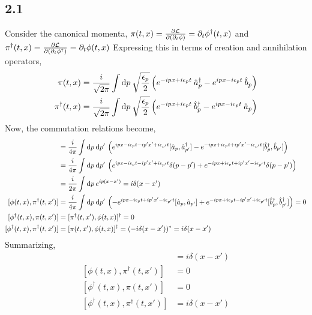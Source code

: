 \documentclass[12pt]{extarticle}
\begin{document}
\subsection*{2.1}
Consider the canonical momenta, $\pi(t, x) = \frac{\partial{\mathcal{L}}}{\partial{(\partial_t \phi)}} = \partial_t \phi^\dagger(t, x)$ and $\pi^\dagger(t, x) = \frac{\partial{\mathcal{L}}}{\partial{(\partial_t \phi^\dagger)}} = \partial_t \phi(t, x)$  Expressing this in terms of creation and annihilation operators,
\begin{align*} 
\pi(t, x) & = \frac{i}{\sqrt{2 \pi}} \int \mathrm{d}p \: \sqrt{\frac{\epsilon_p}{2}} \left(  e^{-i p x + i \epsilon_p t} \: \hat{a}^\dagger_p - e^{i p x - i \epsilon_p t} \: \hat{b}_p\right)
\\
\pi^\dagger(t, x) & = \frac{i}{\sqrt{2 \pi}} \int \mathrm{d}p \: \sqrt{\frac{\epsilon_p}{2}} \left( e^{- i p x + i \epsilon_p t} \: \hat{b}^\dagger_p - e^{i p x - i \epsilon_p t} \: \hat{a}_p \right) 
\end{align*}
Now, the commutation relations become,
\begin{align*}
[\phi(t, x), \pi(t, x')] & = \frac{i}{4\pi} \int \d{p} \d{p'} \left(e^{i p x - i \epsilon_p t - i p' x' + i \epsilon_{p'} t} [\a_p, \adag_{p'}] - e^{-i p x + i \epsilon_p t + i p' x' - i \epsilon_{p'} t} [\bdag_p, \b_{p'}] \right) 
\\
& = \frac{i}{4\pi} \int \d{p} \d{p'} \left(e^{i p x - i \epsilon_p t - i p' x' + i \epsilon_{p'} t} \delta(p - p') + e^{-i p x + i \epsilon_p t + i p' x' - i \epsilon_{p'} t} \delta(p - p') \right) 
\\
& = \frac{i}{2\pi} \int \d{p} e^{i p (x - x')} = i \delta(x  - x') 
\\
[\phi(t, x), \pi^\dagger(t, x')] & = \frac{i}{4\pi} \int \d{p} \d{p'} \left(- e^{i p x - i \epsilon_p t + i p' x' - i \epsilon_{p'} t} [\a_p, \a_{p'}] + e^{-i p x + i \epsilon_p t - i p' x' + i \epsilon_{p'} t} [\bdag_p, \bdag_{p'}] \right) = 0
\\
[\phi^\dagger(t, x), \pi(t, x')] & = [\pi^\dagger(t, x'), \phi(t, x)]^\dagger = 0
\\
[\phi^\dagger(t, x), \pi^\dagger(t, x')] & = [\pi(t, x'), \phi(t, x)]^\dagger = ( - i \delta(x - x'))^* = i \delta(x - x')
\end{align*}
Summarizing,
\begin{align*}
[\phi(t, x), \pi(t, x')] & = i \delta(x - x') \\
[\phi(t, x), \pi^\dagger(t, x')] & = 0 \\
[\phi^\dagger(t, x), \pi(t, x')] & = 0 \\
[\phi^\dagger(t, x), \pi^\dagger(t, x')] & = i \delta(x - x')
\end{align*}
\end{document}

